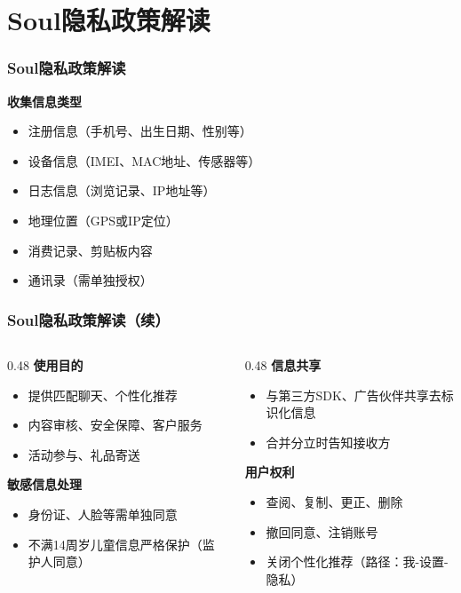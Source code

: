\documentclass[AutoFakeBold,AutoFakeSlant]{beamer}
\begin{document}
\section{Soul隐私政策解读}
\begin{frame}
	\frametitle{Soul隐私政策解读}
	\textbf{收集信息类型}
	\begin{itemize}
		\item 注册信息（手机号、出生日期、性别等）
		\item 设备信息（IMEI、MAC地址、传感器等）
		\item 日志信息（浏览记录、IP地址等）
		\item 地理位置（GPS或IP定位）
		\item 消费记录、剪贴板内容
		\item 通讯录（需单独授权）
	\end{itemize}
\end{frame}

\begin{frame}
	\frametitle{Soul隐私政策解读（续）}
	\begin{columns}
		\begin{column}{0.48\textwidth}
			\textbf{使用目的}
			\begin{itemize}
				\item 提供匹配聊天、个性化推荐
				\item 内容审核、安全保障、客户服务
				\item 活动参与、礼品寄送
			\end{itemize}
			
			\textbf{敏感信息处理}
			\begin{itemize}
				\item 身份证、人脸等需单独同意
				\item 不满14周岁儿童信息严格保护（监护人同意）
			\end{itemize}
		\end{column}
		
		\begin{column}{0.48\textwidth}
			\textbf{信息共享}
			\begin{itemize}
				\item 与第三方SDK、广告伙伴共享去标识化信息
				\item 合并分立时告知接收方
			\end{itemize}
			
			\textbf{用户权利}
			\begin{itemize}
				\item 查阅、复制、更正、删除
				\item 撤回同意、注销账号
				\item 关闭个性化推荐（路径：我-设置-隐私）
			\end{itemize}
		\end{column}
	\end{columns}
\end{frame}
\end{document}
